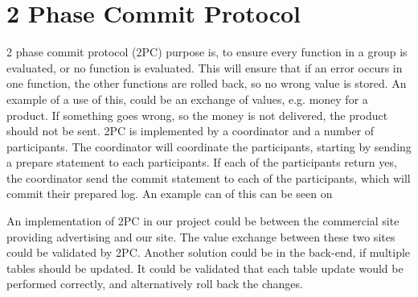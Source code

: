 \section{2 Phase Commit Protocol}
2 phase commit protocol (2PC) purpose is, to ensure every function in a group is evaluated, or no function is evaluated. This will ensure that if an error occurs in one function, the other functions are rolled back, so no wrong value is stored. An example of a use of this, could be an exchange of values, e.g. money for a product. If something goes wrong, so the money is not delivered, the product should not be sent.
2PC is implemented by a coordinator and a number of participants. The coordinator will coordinate the participants, starting by sending a prepare statement to each participants. If each of the participants return yes, the coordinator send the commit statement to each of the participants, which will commit their prepared log. An example can of this can be seen on 


An implementation of 2PC in our project could be between the commercial site providing advertising and our site. The value exchange between these two sites could be validated by 2PC. Another solution could be in the back-end, if multiple tables should be updated. It could be validated that each table update would be performed correctly, and alternatively roll back the changes.